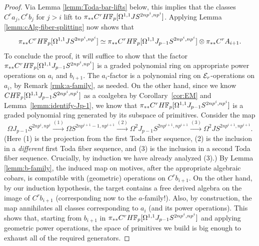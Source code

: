 \documentclass{amsart}
\renewcommand{\NB}[1]{}
\numberwithin{proposition}{section}
\numberwithin{equation}{section}
\begin{document}
\begin{proof}
Via Lemma \ref{lemm:Toda-bar-lifts} below, this implies that the classes $C^ra_j, C^rb_j$ for $j>i$ lift to $\pi_{**} C^r H\mathbb{F}_p[\Omega^{1,1}JS^{2np^i,np^i}]$.
Applying Lemma \ref{lemm:cAlg-fiber-splitting} now shows that \[ \pi_{**} C^r H\mathbb{F}_p[\Omega^{1,1}JS^{2np^i,np^i}] \simeq \pi_{**} C^rH\mathbb{F}_p[\Omega^{1,1}J_{p-1}S^{2np^i,np^i}] \otimes \pi_{**} C^r A_{i+1}. \]
To conclude the proof, it will suffice to show that the factor $\pi_{**} C^r H\mathbb{F}_p[\Omega^{1,1}J_{p-1}S^{2np^i,np^i}]$ is a graded polynomial ring on appropriate power operations on $a_i$ and $b_{i+1}$.
The $a_i$-factor is a polynomial ring on $\mathcal E_r$-operations on $a_i$, by Remark \ref{rmk:a-family}, as needed.
On the other hand, since we know $CH\mathbb{F}_p[\Omega^{1,1}J_{p-1}S^{2np^i,np^i}]$ as a coalgebra by Corollary~\ref{cor:EM} and Lemma~\ref{lemm:identify-Jp-1}, we know that $\pi_{**} C^r H\mathbb{F}_p[\Omega^{1,1}J_{p-1}S^{2np^i,np^i}]$ is a graded polynomial ring generated by its subspace of primitives.
Consider the map \[ \Omega J_{p-1}S^{2np^i,np^i} \xrightarrow{(1)} \Omega S^{2np^{i+1}-1,np^{i+1}} \xrightarrow{(2)} \Omega^2 J_{p-1} S^{2np^{i+1},np^{i+1}} \xrightarrow{(3)} \Omega^2 JS^{2np^{i+1},np^{i+1}}. \]
(Here (1) is the projection from the first Toda fiber sequence, (2) is the inclusion in a \emph{different} first Toda fiber sequence, and (3) is the inclusion in a second Toda fiber sequence.
Crucially, by induction we have already analyzed (3).)
By Lemma \ref{lemm:b-family}, the induced map on motives, after the appropriate algebraic cobars, is compatible with (geometric) operations on $C^rb_{i+1}$.
On the other hand, by our induction hypothesis, the target contains a free derived algebra on the image of $C^rb_{i+1}$ (corresponding now to the $a$-family!).
Also, by construction, the map annihilates all classes corresponding to $a_i$ (and its power operations).
This shows that, starting from $b_{i+1}$ in $\pi_{**}C^r H\mathbb{F}_p[\Omega^{1,1}J_{p-1}S^{2np^i,np^i}]$ and applying geometric power operations, the space of primitives we build is big enough to exhaust all of the required generators.\NB{details?}
\end{proof}
\end{document}

